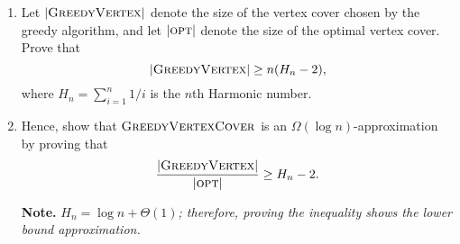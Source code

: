 \documentclass{article}
\begin{document}
\begin{question}
\begin{enumerate}[label = (\alph*)]
    \item Let $\lvert \mathsf{\textsc{GreedyVertex}} \rvert$ denote the size of the vertex cover chosen by the greedy algorithm, and let $\lvert \mathsf{\textsc{opt}}\rvert$ denote the size of the optimal vertex cover. Prove that \[\lvert \mathsf{\textsc{GreedyVertex}} \rvert \geq n(H_n - 2),\] where $H_n = \sum_{i = 1}^n 1/i$ is the $n$th Harmonic number.
    
    \item Hence, show that $\mathsf{\textsc{GreedyVertexCover}}$ is an $\Omega(\log n)$-approximation by proving that \[\frac{\lvert \mathsf{\textsc{GreedyVertex}} \rvert}{\lvert \mathsf{\textsc{opt}} \rvert} \geq H_n - 2.\]

    {\bfseries Note.} {\em $H_n = \log n + \Theta(1)$; therefore, proving the inequality shows the lower bound approximation.}
\end{enumerate}
\end{question}

\pagebreak
\end{document}
